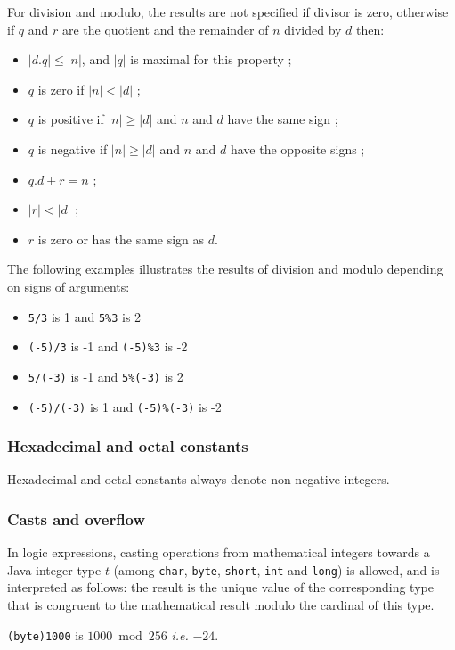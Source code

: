 \documentclass[a4paper,11pt,twoside,openright]{report}
\begin{document}
For division and modulo, the results are not specified if divisor is
zero, otherwise if $q$ and $r$ are the quotient and the remainder of
$n$ divided by $d$ then:
\begin{itemize}
\item $|d.q| \leq |n|$, and $|q|$ is maximal for this property ;
\item $q$ is zero if $|n|<|d|$ ;
\item $q$ is positive if $|n|\geq|d|$ and $n$ and $d$ have the same sign ;
\item $q$ is negative if $|n|\geq|d|$ and $n$ and $d$ have the opposite signs ;
\item $q.d+r = n$ ;
\item $|r|<|d|$ ;
\item $r$ is zero or has the same sign as $d$.
\end{itemize}

\begin{example}
  The following examples illustrates the results of division and modulo depending on signs of arguments:
  \begin{itemize}
  \item \verb|5/3| is 1 and \verb|5%3| is 2
  \item \verb|(-5)/3| is -1 and \verb|(-5)%3| is -2
  \item \verb|5/(-3)| is -1 and \verb|5%(-3)| is 2
  \item \verb|(-5)/(-3)| is 1 and \verb|(-5)%(-3)| is -2
  \end{itemize}
\end{example}

\subsubsection{Hexadecimal and octal constants}

Hexadecimal and octal constants always denote non-negative integers. 

\subsubsection{Casts and overflow}

In logic expressions, casting operations from mathematical integers
towards a Java integer type $t$ (among \texttt{char}, \texttt{byte},
\texttt{short}, \texttt{int} and \texttt{long}) is
allowed, and is interpreted as follows: the result is the unique value
of the corresponding type that is congruent to the mathematical result
modulo the cardinal of this type.
\begin{example}
  \texttt{(byte)1000} is $1000 \bmod 256$ \emph{i.e.} $-24$.
\end{example}
\end{document}
